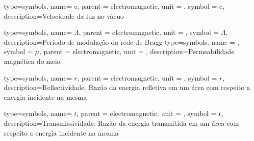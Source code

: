 {type=symbols,
    name= \ensuremath{\mathrm{c}},
    parent = {electromagnetic},
    unit = \unexpanded{\si{\meter\per\second}},
    symbol = \ensuremath{\mathrm{c}},
    description={Velocidade da luz no vácuo}
}

{type=symbols,
    name= \ensuremath{\Lambda},
    parent = {electromagnetic},
    unit = \unexpanded{\si{\meter}},
    symbol = \ensuremath{\Lambda},
    description={Período de modulação da rede de Bragg}
}
{type=symbols,
    name = ,
    symbol = \ensuremath{\mu},
    parent = {electromagnetic},
    unit = \unexpanded{\si{\henry\per\meter}},
    description={Permeabilidade magnética do meio}
}

{type=symbols,
name= \ensuremath{r},
parent = {electromagnetic},
unit = \unexpanded{},
symbol = \ensuremath{r},
description={Reflectividade. Razão da energia refletiva em um área com respeito a energia incidente na mesma}
}


{type=symbols,
    name= \ensuremath{t},
    parent = {electromagnetic},
    unit = \unexpanded{},
    symbol = \ensuremath{t},
    description={Transmissividade. Razão da energia transmitida em um área com respeito a energia incidente na mesma}
}




